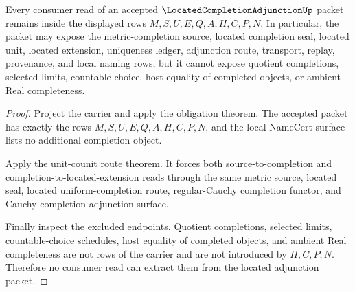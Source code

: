 \begin{theorem}
\label{thm:located-completion-adjunction-nonescape}
Every consumer read of an accepted $\LocatedCompletionAdjunctionUp$ packet remains inside the displayed rows $M,S,U,E,Q,A,H,C,P,N$. In particular, the packet may expose the metric-completion source, located completion seal, located unit, located extension, uniqueness ledger, adjunction route, transport, replay, provenance, and local naming rows, but it cannot expose quotient completions, selected limits, countable choice, host equality of completed objects, or ambient Real completeness.
\end{theorem}
\begin{proof}
Project the carrier and apply the obligation theorem. The accepted packet has exactly the rows $M,S,U,E,Q,A,H,C,P,N$, and the local NameCert surface lists no additional completion object.

Apply the unit-counit route theorem. It forces both source-to-completion and completion-to-located-extension reads through the same metric source, located seal, located uniform-completion route, regular-Cauchy completion functor, and Cauchy completion adjunction surface.

Finally inspect the excluded endpoints. Quotient completions, selected limits, countable-choice schedules, host equality of completed objects, and ambient Real completeness are not rows of the carrier and are not introduced by $H,C,P,N$. Therefore no consumer read can extract them from the located adjunction packet.
\end{proof}




